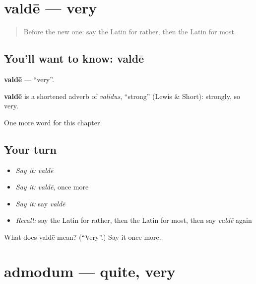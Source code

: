 \section[valdē]{valdē — very}

\label{lesson:LA-C179-valde}



\begin{quote}
Before the new one: say the Latin for rather, then the Latin for most.
\end{quote}

\subsection*{You'll want to know: valdē}
\textbf{valdē} — \textquotedblleft{}very\textquotedblright{}.

\begin{cousinweb}
\textbf{valdē} is a shortened adverb of \emph{validus}, \textquotedblleft{}strong\textquotedblright{} (Lewis \& Short): strongly, so very.
\end{cousinweb}

\begin{grammarlens}[title={What you've built}]
One more word for this chapter.
\end{grammarlens}

\subsection*{Your turn}
\begin{itemize}
\raggedright
  \item \emph{Say it:} \emph{valdē}
  \item \emph{Say it:} \emph{valdē}, once more
  \item \emph{Say it:} say \emph{valdē}
  \item \emph{Recall:} say the Latin for rather, then the Latin for most, then say \emph{valdē} again
\end{itemize}

\begin{tcolorbox}[breakable,colback=teal!4,colframe=teal!35!black,title={Before you move on}]
What does valdē mean? (\textquotedblleft{}Very\textquotedblright{}.) Say it once more.
\end{tcolorbox}
\section[admodum]{admodum — quite, very}

